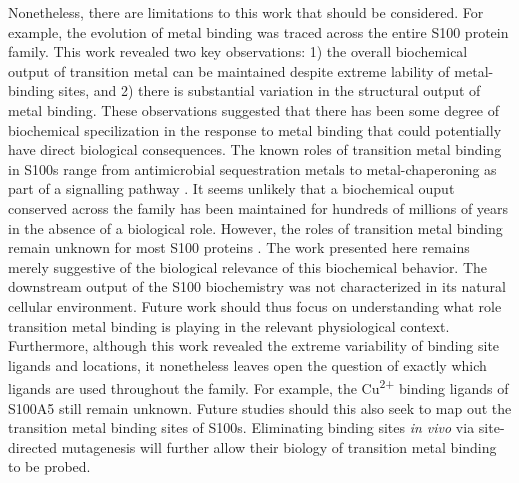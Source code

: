 Nonetheless, there are limitations to this work that should be considered.
For example, the evolution of metal binding was traced across the
entire S100 protein family. This work revealed two key observations:
1) the overall biochemical output of transition metal can be maintained
despite extreme lability of metal-binding sites, and 2) there is substantial
variation in the structural output of metal binding. These observations
suggested that there has been some degree of biochemical specilization
in the response to metal binding that could potentially have direct
biological consequences. The known roles of transition metal binding
in S100s range from antimicrobial sequestration metals \citep{damo_molecular_2013}
to metal-chaperoning as part of a signalling pathway \citep{sivaraja_copper_2006}.
It seems unlikely that a biochemical ouput conserved across the family
has been maintained for hundreds of millions of years in the absence
of a biological role. However, the roles of transition metal binding
remain unknown for most S100 proteins \citep{moroz_role_2010,gilston_binding_2016,wheeler_multiple_2016}.
The work presented here remains merely suggestive of the biological
relevance of this biochemical behavior. The downstream output of the
S100 biochemistry was not characterized in its natural cellular environment.
Future work should thus focus on understanding what role transition
metal binding is playing in the relevant physiological context. Furthermore,
although this work revealed the extreme variability of binding site
ligands and locations, it nonetheless leaves open the question of
exactly which ligands are used throughout the family. For example,
the Cu\textsuperscript{2+} binding ligands of S100A5 still remain unknown. Future
studies should this also seek to map out the transition metal binding
sites of S100s. Eliminating binding sites \textit{in vivo} via site-directed
mutagenesis will further allow their biology of transition metal binding
to be probed. 

